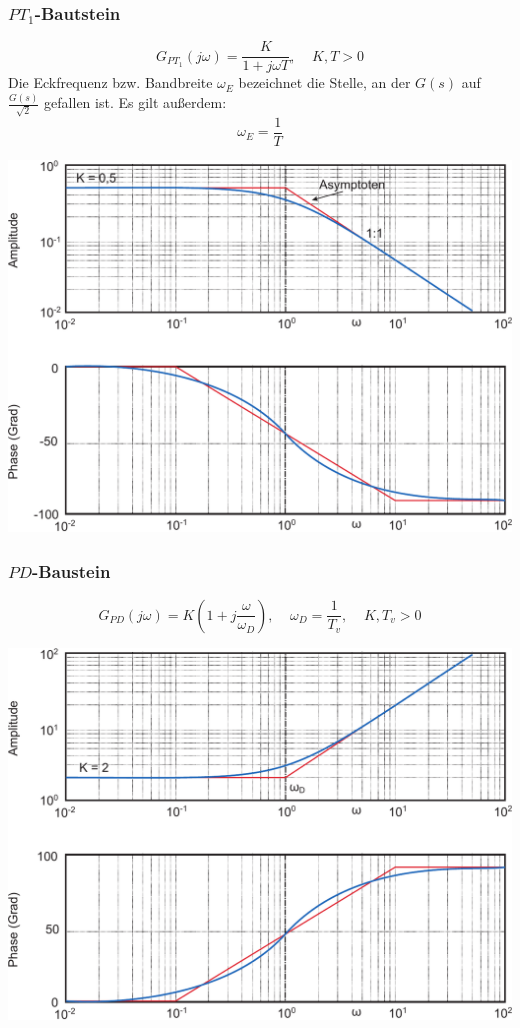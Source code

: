 \documentclass[a4paper,twocolumn,10pt]{article}
\begin{document}
\subsubsection{$PT_1$-Bautstein}
\begin{equation*}
G_{PT_1}(j\omega)=\frac{K}{1+j\omega T},\;\;\;\;K,T>0
\end{equation*}
Die Eckfrequenz bzw. Bandbreite $\omega_E$ bezeichnet die Stelle, an der $G(s)$ auf $\frac{G(s)}{\sqrt{2}}$ gefallen ist.
Es gilt außerdem:
\begin{equation*}
\omega_E=\frac{1}{T}
\end{equation*}
\begin{center}
\includegraphics[width=0.95\columnwidth]{Grafiken/Bodediagramm_PT1}
\end{center}

\subsubsection{$PD$-Baustein}
\begin{equation*}
G_{PD}(j\omega)=K\left(1+j\frac{\omega}{\omega_D}\right),\;\;\;\;\omega_D=\frac{1}{T_v},\;\;\;\;K,T_v>0
\end{equation*}
\begin{center}
\includegraphics[width=0.95\columnwidth]{Grafiken/Bodediagramm_PD}
\end{center}
\end{document}
